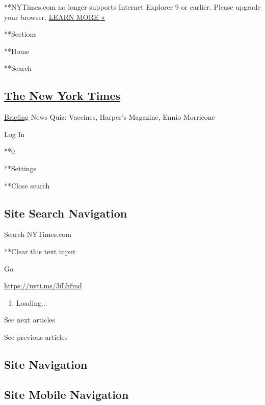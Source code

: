 **NYTimes.com no longer supports Internet Explorer 9 or earlier. Please
upgrade your browser.
\href{http://www.nytimes.com/content/help/site/ie9-support.html}{LEARN
MORE »}

**Sections

**Home

**Search

\hypertarget{the-new-york-times}{%
\subsection{\texorpdfstring{\href{http://www.nytimes.com/}{The New York
Times}}{The New York Times}}\label{the-new-york-times}}


\href{/interactive/2018/briefing/global-morning-briefing-newsletter-signup.html}{Briefing}
\textbar{}News Quiz: Vaccines, Harper's Magazine, Ennio Morricone

Log In

**0

**Settings

**Close search

\hypertarget{site-search-navigation}{%
\subsection{Site Search Navigation}\label{site-search-navigation}}

Search NYTimes.com

**Clear this text input

Go

\url{https://nyti.ms/3iLhfmd}

\begin{enumerate}
\def\labelenumi{\arabic{enumi}.}
\item
  Loading...
\end{enumerate}

See next articles

See previous articles

\hypertarget{site-navigation}{%
\subsection{Site Navigation}\label{site-navigation}}

\hypertarget{site-mobile-navigation}{%
\subsection{Site Mobile Navigation}\label{site-mobile-navigation}}


